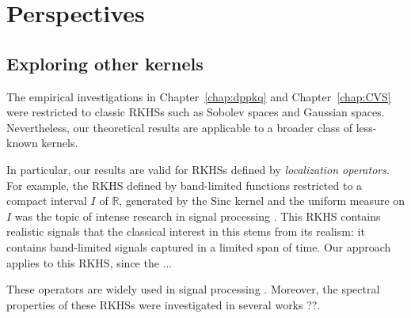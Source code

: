 \documentclass[twoside,11pt]{book}
\numberwithin{theorem}{chapter}
\numberwithin{definition}{chapter}
\numberwithin{proposition}{chapter}
\numberwithin{corollary}{chapter}
\numberwithin{example}{chapter}
\numberwithin{lemma}{chapter}
\numberwithin{assumption}{chapter}
\numberwithin{equation}{chapter}
\numberwithin{figure}{chapter}
\begin{document}








\section{Perspectives}\label{sec:perspectives}


\subsection{Exploring other kernels}\label{sec:new_kernels}

The empirical investigations in Chapter~\ref{chap:dppkq} and Chapter~\ref{chap:CVS} were restricted to  classic RKHSs such as Sobolev spaces and Gaussian spaces. Nevertheless, our theoretical results are applicable to a broader class of less-known kernels.


In particular, our results are valid for RKHSs defined by \emph{localization operators}. For example, the RKHS  defined by band-limited functions restricted to a compact interval $I$ of $\mathbb{R}$, generated by the Sinc kernel and the uniform measure on $I$ was the topic of intense research in signal processing \parencite{SlPo61,LaPo61}. This RKHS contains  realistic signals that the classical interest in this  stems from its realism: it contains band-limited signals captured in a limited span of time. Our approach applies to this RKHS, since the ...


 These operators are widely used in signal processing \parencite{SlPo61,LaPo61,Dau88}. Moreover, the spectral properties of these RKHSs were investigated in several works ??.
\end{document}
